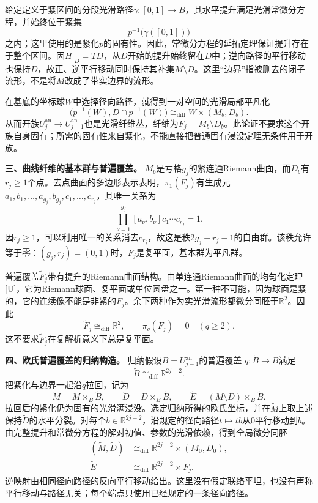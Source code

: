 \documentclass[UTF8,a4paper]{ctexbook}
\begin{document}
给定定义于紧区间的分段光滑路径$\gamma\colon[0,1]\to B$，其水平提升满足光滑常微分方程，并始终位于紧集
\[
p^{-1}\bigl(\gamma([0,1])\bigr)
\]
之内；这里使用的是紧化$p$的固有性。因此，常微分方程的延拓定理保证提升存在于整个区间。因$H|_D=TD$，从$D$开始的提升始终留在$D$中；逆向路径的平行移动也保持$D$，故正、逆平行移动同时保持其补集$M\setminus D$。这里“边界”指被删去的闭子流形，不是将$M$改成了带实边界的流形。

在基底的坐标球$W$中选择径向路径，就得到一对空间的光滑局部平凡化
\[
\bigl(p^{-1}(W),D\cap p^{-1}(W)\bigr)
\cong_{\mathrm{diff}}W\times(M_b,D_b).
\]
从而开族$U_j^{\mathrm{an}}\to U_{j-1}^{\mathrm{an}}$也是光滑纤维丛，纤维为$F_j=M_b\setminus D_b$。此论证不要求这个开族自身固有；所需的固有性来自紧化，不能直接把普通固有浸没定理无条件用于开族。

\par\medskip\noindent\textbf{三、曲线纤维的基本群与普遍覆盖。}
$M_b$是亏格$g_j$的紧连通Riemann曲面，而$D_b$有$r_j\geq1$个点。去点曲面的多边形表示表明，$\pi_1(F_j)$有生成元
$a_1,b_1,\ldots,a_{g_j},b_{g_j},c_1,\ldots,c_{r_j}$，其唯一关系为
\[
\prod_{\nu=1}^{g_j}[a_\nu,b_\nu]c_1\cdots c_{r_j}=1.
\]
因$r_j\geq1$，可以利用唯一的关系消去$c_{r_j}$，故这是秩$2g_j+r_j-1$的自由群。该秩允许等于零：$(g_j,r_j)=(0,1)$时，$F_j$是复平面，基本群为平凡群。

普遍覆盖$\widetilde F_j$带有提升的Riemann曲面结构。由单连通Riemann曲面的均匀化定理[U]，它为Riemann球面、复平面或单位圆盘之一。第一种不可能，因为球面是紧的，它的连续像不能是非紧的$F_j$。余下两种作为实光滑流形都微分同胚于$\mathbb R^2$。因此
\[
\widetilde F_j\cong_{\mathrm{diff}}\mathbb R^2,\qquad
\pi_q(F_j)=0\quad(q\geq2).
\]
这不要求$\widetilde F_j$在复解析意义下总是复平面。

\par\medskip\noindent\textbf{四、欧氏普遍覆盖的归纳构造。}
归纳假设$B=U_{j-1}^{\mathrm{an}}$的普遍覆盖
$q\colon\widetilde B\to B$满足
\[
\widetilde B\cong_{\mathrm{diff}}\mathbb R^{2j-2}.
\]
把紧化与边界一起沿$q$拉回，记为
\[
\widetilde M=M\times_B\widetilde B,\qquad
\widetilde D=D\times_B\widetilde B,\qquad
\widetilde E=(M\setminus D)\times_B\widetilde B.
\]
拉回后的紧化仍为固有的光滑满浸没。选定归纳所得的欧氏坐标，并在$\widetilde M$上取上述保持$\widetilde D$的水平分裂。对每个$b\in\mathbb R^{2j-2}$，沿规定的径向路径$t\mapsto tb$从$0$平行移动到$b$。由完整提升和常微分方程的解对初值、参数的光滑依赖，得到全局微分同胚
\[
\begin{aligned}
(\widetilde M,\widetilde D)
&\cong_{\mathrm{diff}}\mathbb R^{2j-2}\times(M_0,D_0),\\
\widetilde E&\cong_{\mathrm{diff}}\mathbb R^{2j-2}\times F_j.
\end{aligned}
\]
逆映射由相同径向路径的反向平行移动给出。这里没有假定联络平坦，也没有声称平行移动与路径无关；每个端点只使用已经规定的一条径向路径。
\end{document}
